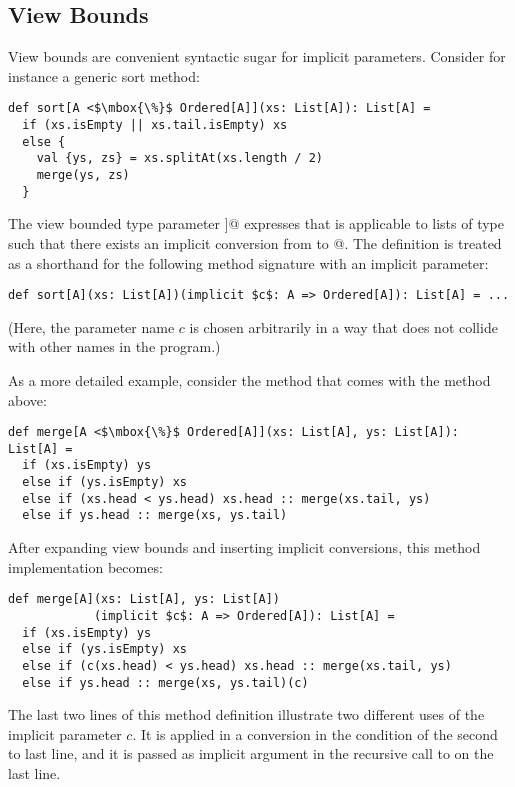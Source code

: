 {\subsection*{View Bounds}

View bounds are convenient syntactic sugar for implicit
parameters. Consider for instance a generic sort method:
\begin{lstlisting}
def sort[A <$\mbox{\%}$ Ordered[A]](xs: List[A]): List[A] =
  if (xs.isEmpty || xs.tail.isEmpty) xs
  else {
    val {ys, zs} = xs.splitAt(xs.length / 2)
    merge(ys, zs)
  }
\end{lstlisting}
The view bounded type parameter \lstinline@[a <$\mbox{\%}$ Ordered[a]]@
expresses that \lstinline@sort@ is applicable to lists of type
\lstinline@a@ such that there exists an implicit conversion from
\lstinline@a@ to \lstinline@Ordered[a]@. The definition is treated as
a shorthand for the following method signature with an implicit
parameter:
\begin{lstlisting}
def sort[A](xs: List[A])(implicit $c$: A => Ordered[A]): List[A] = ...
\end{lstlisting}
(Here, the parameter name $c$ is chosen arbitrarily in a way
that does not collide with other names in the program.)

As a more detailed example, consider the \lstinline@merge@ method that
comes with the \lstinline@sort@ method above:
\begin{lstlisting}
def merge[A <$\mbox{\%}$ Ordered[A]](xs: List[A], ys: List[A]): List[A] =
  if (xs.isEmpty) ys
  else if (ys.isEmpty) xs
  else if (xs.head < ys.head) xs.head :: merge(xs.tail, ys)
  else if ys.head :: merge(xs, ys.tail)
\end{lstlisting}
After expanding view bounds and inserting implicit conversions, this
method implementation becomes:
\begin{lstlisting}
def merge[A](xs: List[A], ys: List[A])
            (implicit $c$: A => Ordered[A]): List[A] =
  if (xs.isEmpty) ys
  else if (ys.isEmpty) xs
  else if (c(xs.head) < ys.head) xs.head :: merge(xs.tail, ys)
  else if ys.head :: merge(xs, ys.tail)(c)
\end{lstlisting}
The last two lines of this method definition illustrate two different
uses of the implicit parameter $c$. It is applied in a conversion in
the condition of the second to last line, and it is passed as implicit
argument in the recursive call to \lstinline@merge@ on the last line.

}
